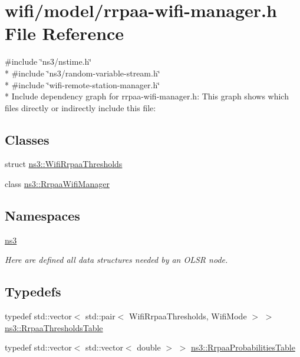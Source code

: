 \hypertarget{rrpaa-wifi-manager_8h}{}\section{wifi/model/rrpaa-\/wifi-\/manager.h File Reference}
\label{rrpaa-wifi-manager_8h}
{\ttfamily \#include \char`\"{}ns3/nstime.\+h\char`\"{}}\\*
{\ttfamily \#include \char`\"{}ns3/random-\/variable-\/stream.\+h\char`\"{}}\\*
{\ttfamily \#include \char`\"{}wifi-\/remote-\/station-\/manager.\+h\char`\"{}}\\*
Include dependency graph for rrpaa-\/wifi-\/manager.h\+:
This graph shows which files directly or indirectly include this file\+:
\subsection*{Classes}
\begin{DoxyCompactItemize}
\item 
struct \hyperlink{structns3_1_1WifiRrpaaThresholds}{ns3\+::\+Wifi\+Rrpaa\+Thresholds}
\item 
class \hyperlink{classns3_1_1RrpaaWifiManager}{ns3\+::\+Rrpaa\+Wifi\+Manager}
\end{DoxyCompactItemize}
\subsection*{Namespaces}
\begin{DoxyCompactItemize}
\item 
 \hyperlink{namespacens3}{ns3}
\begin{DoxyCompactList}\small\item\em Here are defined all data structures needed by an O\+L\+SR node. \end{DoxyCompactList}\end{DoxyCompactItemize}
\subsection*{Typedefs}
\begin{DoxyCompactItemize}
\item 
typedef std\+::vector$<$ std\+::pair$<$ Wifi\+Rrpaa\+Thresholds, Wifi\+Mode $>$ $>$ \hyperlink{namespacens3_a07e3435ea7b0625f3b3abcbec4416523}{ns3\+::\+Rrpaa\+Thresholds\+Table}
\item 
typedef std\+::vector$<$ std\+::vector$<$ double $>$ $>$ \hyperlink{namespacens3_a120051d4d36bbbc9b101cb0012cb1e48}{ns3\+::\+Rrpaa\+Probabilities\+Table}
\end{DoxyCompactItemize}
